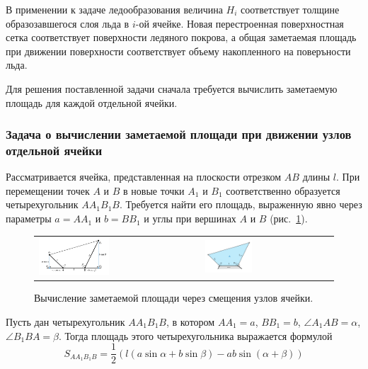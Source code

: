 В применении к задаче ледообразования величина $H_i$ соответствует толщине образозавшегося слоя льда в $i$-ой ячейке.
Новая перестроенная поверхностная сетка соответствует поверхности ледяного покрова, а общая заметаемая площадь при движении поверхности соответствует объему накопленного на поверъности льда.

Для решения поставленной задачи сначала требуется вычислить заметаемую площадь для каждой отдельной ячейки.

\subsubsection{Задача о вычислении заметаемой площади при движении узлов отдельной ячейки}

Рассматривается ячейка, представленная на плоскости отрезком $AB$ длины $l$.
При перемещении точек $A$ и $B$ в новые точки $A_1$ и $B_1$ соответственно образуется четырехугольник $AA_1B_1B$.
Требуется найти его площадь, выраженную явно через параметры $a = AA_1$ и $b = BB_1$ и углы при вершинах $A$ и $B$ (рис.~\ref{fig:text_1_remesh_2d_local}).

\begin{figure}[ht]
\centering
\begin{tabular}{ll}
	\includegraphics[width=0.45\textwidth]{pics/text_1_remesh_2d/local.pdf}
	&
	\includegraphics[width=0.38\textwidth]{pics/text_1_remesh_2d/local2.pdf}
\end{tabular}
\singlespacing
{}\caption{Вычисление заметаемой площади через смещения узлов ячейки.}
\label{fig:text_1_remesh_2d_local}
\end{figure}

\begin{lemma}\label{lem:text_1_remesh_2d_AA1B1B}
Пусть дан четырехугольник $AA_1B_1B$, в котором $AA_1 = a$, $BB_1 = b$, $\angle A_1AB = \alpha$, $\angle B_1BA = \beta$.
Тогда площадь этого четырехугольника выражается формулой
\begin{equation}\label{eqn:text_1_remesh_2d_one_cell_lemma}
S_{AA_1B_1B} = \frac{1}{2} \left( l (a \sin \alpha + b \sin \beta) - ab \sin (\alpha + \beta) \right)
\end{equation}
\end{lemma}

